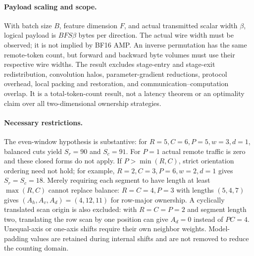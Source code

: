 \paragraph{Payload scaling and scope.}
With batch size $B$, feature dimension $F$, and actual transmitted scalar
width $\beta$, logical payload is $BFS\beta$ bytes per direction.
The actual wire width must be observed; it is not implied by BF16 AMP.
An inverse permutation has the same remote-token count, but forward and
backward byte volumes must use their respective wire widths.
The result excludes stage-entry and stage-exit redistribution,
convolution halos, parameter-gradient reductions, protocol overhead,
local packing and restoration, and communication--computation overlap.
It is a total-token-count result, not a latency theorem or an optimality
claim over all two-dimensional ownership strategies.

\paragraph{Necessary restrictions.}
The even-window hypothesis is substantive: for
$R=5,C=6,P=5,w=3,d=1$, balanced cuts yield $S_r=90$ and $S_c=91$.
For $P=1$ actual remote traffic is zero and these closed forms do not apply.
If $P>\min(R,C)$, strict orientation ordering need not hold; for example,
$R=2,C=3,P=6,w=2,d=1$ gives $S_r=S_c=18$.
Merely requiring each segment to have length at least $\max(R,C)$ cannot
replace balance: $R=C=4,P=3$ with lengths $(5,4,7)$ gives
$(A_h,A_v,A_d)=(4,12,11)$ for row-major ownership.
A cyclically translated scan origin is also excluded: with $R=C=P=2$
and segment length two, translating the row scan by one position can
give $A_d=0$ instead of $PC=4$.
Unequal-axis or one-axis shifts require their own neighbor weights.
Model-padding values are retained during internal shifts and are not
removed to reduce the counting domain.